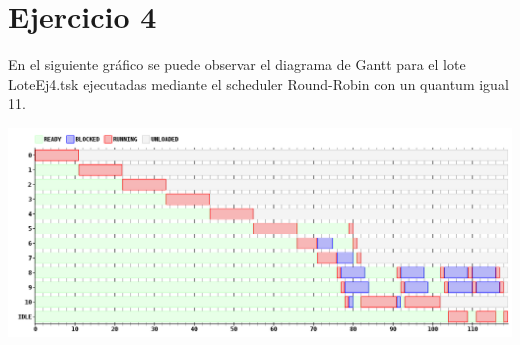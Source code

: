 \section{Ejercicio 4}



En el siguiente gráfico se puede observar el diagrama de Gantt para el lote LoteEj4.tsk ejecutadas mediante el scheduler Round-Robin con un quantum igual 11.

\begin {center}
\includegraphics[width=16cm]{../simusched/outputs/outEj4.png}
\end {center}

